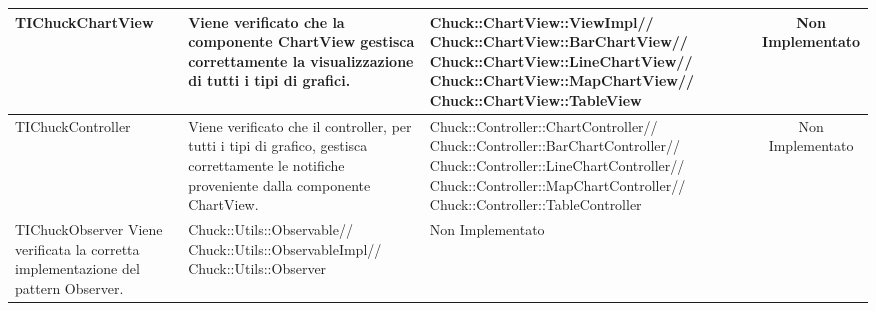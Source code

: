 \begin{table}[H]
\begin{center}
\begin{tabu}{| l | l | l | c |}
	TIChuckChartView
				&
Viene verificato che la componente ChartView gestisca correttamente la visualizzazione di tutti i tipi di grafici.
			& \parbox[t]{0.4\textwidth}{
Chuck::ChartView::ViewImpl//
Chuck::ChartView::BarChartView//
Chuck::ChartView::LineChartView//
Chuck::ChartView::MapChartView//
Chuck::ChartView::TableView}
			& Non Implementato
			\\ \hline



	TIChuckController
				&
Viene verificato che il controller, per tutti i tipi di grafico, gestisca correttamente le notifiche proveniente dalla componente ChartView.
			& \parbox[t]{0.4\textwidth}{
Chuck::Controller::ChartController//
Chuck::Controller::BarChartController//
Chuck::Controller::LineChartController//
Chuck::Controller::MapChartController//
Chuck::Controller::TableController}
			& Non Implementato
			\\ \hline



	TIChuckObserver
Viene verificata la corretta implementazione del pattern Observer.
			& \parbox[t]{0.4\textwidth}{
Chuck::Utils::Observable//
Chuck::Utils::ObservableImpl//
Chuck::Utils::Observer}
			& Non Implementato
			\\ \hline











\end{tabu}
\end{center}
\end{table}

